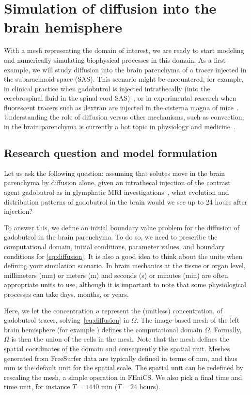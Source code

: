 \section{Simulation of diffusion into the brain hemisphere}
\label{sec:chp3:math}

With a mesh representing the domain of interest, we are ready to start
modeling and numerically simulating biophysical processes in this
domain. As a first example, we will study diffusion into the brain
parenchyma of a tracer injected in the subarachnoid space (SAS). This
scenario might be encountered, for example, in clinical practice when
gadobutrol is injected intrathecally (into the cerebrospinal fluid in
the spinal cord SAS)~\cite{ringstad2018brain}, or in experimental
research when fluorescent tracers such as dextran are injected in the
cisterna magna of mice~\cite{iliff2012paravascular,
  xie2013sleep}. Understanding the role of diffusion versus other
mechanisms, such as convection, in the brain parenchyma is currently a
hot topic in physiology and medicine~\cite{abbott2018role}.

\subsection{Research question and model formulation}
\label{chp3:model}

Let us ask the following question: assuming that solutes move in the
brain parenchyma by diffusion alone, given an intrathecal injection of
the contrast agent gadobutrol as in glymphatic MRI
investigations~\cite{ringstad2018brain}, what evolution and
distribution patterns of gadobutrol in the brain would we see up to 24
hours after injection?

To answer this, we define an initial boundary value problem for the
diffusion of gadobutrol in the brain parenchyma. To do so, we need to
prescribe the computational domain, initial conditions, parameter
values, and boundary conditions for \eqref{eq:diffusion}. It is also a
good idea to think about the units when defining your simulation
scenario. In brain mechanics at the tissue or organ level, millimeters
(mm) or meters (m) and seconds (s) or minutes (min) are often
appropriate units to use, although it is important to note that some
physiological processes can take days, months, or years.

Here, we let the concentration $u$ represent the (unitless)
concentration, of gadobutrol tracer, solving~\eqref{eq:diffusion} in
$\Omega$. The image-based mesh of the left brain hemisphere (for
example ) defines the computational domain
$\Omega$. Formally, $\Omega$ is then the union of the cells in the
mesh. Note that the mesh defines the spatial coordinates of the domain
and consequently the spatial unit. Meshes generated from FreeSurfer
data are typically defined in terms of mm, and thus mm is the default
unit for the spatial scale. The spatial unit can be redefined by
rescaling the mesh, a simple operation in FEniCS. We also pick a final
time and time unit, for instance $T = 1440$ min ($T = 24$ hours).

